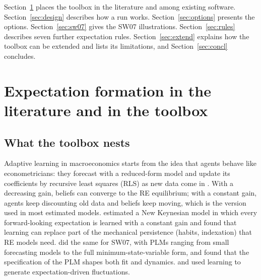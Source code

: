 \documentclass[pdflatex,sn-basic]{sn-jnl}
\begin{document}
Section~\ref{sec:lit} places the toolbox in the literature and among existing software.
Section~\ref{sec:design} describes how a run works. Section~\ref{sec:options} presents the
options. Section~\ref{sec:sw07} gives the SW07 illustrations. Section~\ref{sec:rules} describes
seven further expectation rules. Section~\ref{sec:extend} explains how the toolbox can be
extended and lists its limitations, and Section~\ref{sec:concl} concludes.

\section{Expectation formation in the literature and in the toolbox}\label{sec:lit}

\subsection{What the toolbox nests}\label{sec:nests}

Adaptive learning in macroeconomics starts from the idea that agents behave like econometricians:
they forecast with a reduced-form model and update its coefficients by recursive least squares
(RLS) as new data come in \citep{marcet1989,evans2001}. With a decreasing gain, beliefs can
converge to the RE equilibrium; with a constant gain, agents keep discounting old data and
beliefs keep moving, which is the version used in most estimated models. \citet{milani2007} estimated
a New Keynesian model in which every forward-looking expectation is learned with a constant gain
and found that learning can replace part of the mechanical persistence (habits, indexation) that
RE models need. \citet{slobodyan2012a,slobodyan2012b} did the same for SW07, with PLMs ranging
from small forecasting models to the full minimum-state-variable form, and found that the
specification of the PLM shapes both fit and dynamics. \citet{eusepi2011} and \citet{milani2011}
used learning to generate expectation-driven fluctuations.
\end{document}
